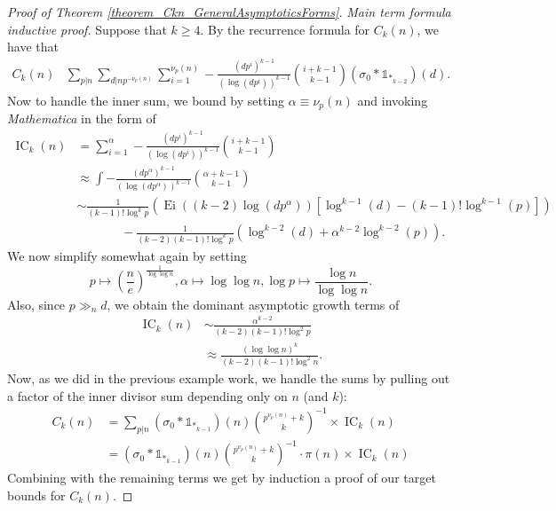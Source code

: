 \documentclass[11pt,reqno,a4letter]{article}
\numberwithin{figure}{section}
\numberwithin{table}{section}
\theoremstyle{plain}
\numberwithin{theorem}{section}
\theoremstyle{definition}
\newcommand{\NBRef}[1]{
     \todo[linecolor=green!85!white,backgroundcolor=orange!50!white,bordercolor=blue!30!black,textcolor=cyan!15!black,shadow,size=\small,fancyline]{
     \color{NBRefColor}{\textbf{#1}
     }
     }
}
\begin{document}
\begin{proof}[Proof of Theorem \ref{theorem_Ckn_GeneralAsymptoticsForms}]
\NBRef{A08-2020-04-26} 
\textit{Main term formula inductive proof.} 
Suppose that $k \geq 4$. By the recurrence formula for $C_k(n)$, we have that 
\begin{align*} 
C_k(n) & \sum_{p|n} \sum_{d|np^{-\nu_p(n)}} \sum_{i=1}^{\nu_p(n)} -\frac{(dp^i)^{k-1}}{(\log(dp^i))^{k-1}} 
     \binom{i+k-1}{k-1} (\sigma_0 \ast \mathds{1}_{\ast_{k-2}})(d). 
\end{align*} 
Now to handle the inner sum, we bound by setting $\alpha \equiv \nu_p(n)$ and 
invoking \emph{Mathematica} in the form of 
\begin{align*} 
\operatorname{IC}_k(n) & = \sum_{i=1}^{\alpha} -\frac{(dp^i)^{k-1}}{(\log(dp^i))^{k-1}} 
     \binom{i+k-1}{k-1} \\ 
     & \approx \int -\frac{(dp^{\alpha})^{k-1}}{(\log(dp^{\alpha}))^{k-1}} 
     \binom{\alpha+k-1}{k-1} \\ 
     & \sim \frac{1}{(k-1)! \log^k p} \left( 
     \operatorname{Ei}((k-2) \log(dp^{\alpha})) \left[
     \log^{k-1}(d) - (k-1)! \log^{k-1}(p)\right] 
     \right) \\ 
     & \phantom{\approx\qquad\ } - 
     \frac{1}{(k-2) (k-1)! \log^k p} \left( 
     \log^{k-2}(d) + \alpha^{k-2} \log^{k-2}(p) 
     \right). 
\end{align*} 
We now simplify somewhat again by setting
$$p \mapsto \left(\frac{n}{e}\right)^{\frac{1}{\log\log n}}, \alpha \mapsto \log\log n, 
  \log p \mapsto \frac{\log n}{\log\log n}.$$ 
Also, since $p \gg_{n} d$, we obtain the dominant asymptotic growth terms of 
\begin{align*} 
\operatorname{IC}_k(n) & \sim \frac{\alpha^{k-2}}{(k-2) (k-1)! \log^2 p} \\ 
     & \approx \frac{(\log\log n)^k}{(k-2) (k-1)! \log^2 n}. 
\end{align*} 
Now, as we did in the previous example work, we handle the sums by pulling out a factor of the inner 
divisor sum depending only on $n$ (and $k$): 
\begin{align*} 
C_k(n) & = \sum_{p|n} (\sigma_0 \ast \mathds{1}_{\ast_{k-1}})(n) 
     \binom{p^{\nu_p(n)} + k}{k}^{-1} \times \operatorname{IC}_k(n) \\ 
     & = (\sigma_0 \ast \mathds{1}_{\ast_{k-1}})(n) 
     \binom{p^{\nu_p(n)} + k}{k}^{-1} \cdot \pi(n) \times \operatorname{IC}_k(n)
\end{align*} 
Combining with the remaining terms we get by induction a proof of our target bounds 
for $C_k(n)$. 


\end{proof}
\end{document}
